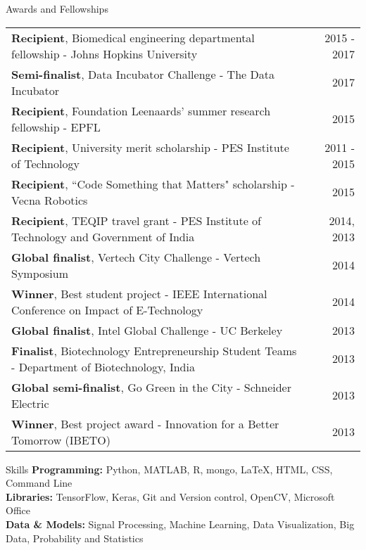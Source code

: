 \documentclass{resume}
\begin{document}
        \begin{rSection}{Awards and Fellowships}
\begin{tabular*}{\textwidth}{@{\extracolsep{\fill}}lr@{}}
\textbf{Recipient}, Biomedical engineering departmental fellowship - Johns Hopkins University & 2015 - 2017\\ 
\textbf{Semi-finalist}, Data Incubator Challenge - The Data Incubator & 2017\\
\textbf{Recipient}, Foundation Leenaards' summer research fellowship - EPFL &  2015\\
\textbf{Recipient}, University merit scholarship - PES Institute of Technology & 2011 - 2015 \\ 
\textbf{Recipient}, ``Code Something that Matters" scholarship - Vecna Robotics & 2015\\
\textbf{Recipient}, TEQIP travel grant - PES Institute of Technology and Government of India& 2014, 2013 \\ 
\textbf{Global finalist}, Vertech City Challenge - Vertech Symposium  & 2014\\
\textbf{Winner}, Best student project - IEEE International Conference on Impact of E-Technology & 2014\\
\textbf{Global finalist}, Intel Global Challenge -  UC Berkeley & 2013 \\
\textbf{Finalist}, Biotechnology Entrepreneurship Student Teams - Department of Biotechnology, India & 2013\\
\textbf{Global semi-finalist}, Go Green in the City - Schneider Electric & 2013 \\
\textbf{Winner}, Best project award - Innovation for a Better Tomorrow (IBETO)  & 2013\\
\end{tabular*}
    \end{rSection}

\vspace{1em}

    \begin{rSection}{Skills}
\textbf{Programming:} Python, MATLAB, R, mongo, \LaTeX, HTML, CSS, Command Line\\
\textbf{Libraries:} TensorFlow, Keras, Git and Version control, OpenCV, Microsoft Office \\
\textbf{Data \& Models:} Signal Processing, Machine Learning, Data Visualization, Big Data, Probability and Statistics
\end{rSection} 

\vspace{1em}
\end{document}
